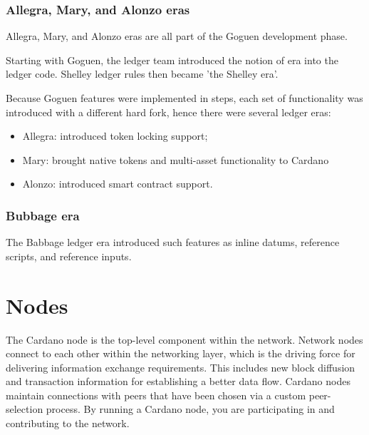 \vspace{0.5cm}

\subsubsection{Allegra, Mary, and Alonzo eras}

Allegra, Mary, and Alonzo eras are all part of the Goguen development phase.

\vspace{0.2cm}

\noindent
Starting with Goguen, the ledger team introduced the notion of era into the ledger code. 
Shelley ledger rules then became 'the Shelley era'.

\vspace{0.2cm}

\noindent
Because Goguen features were implemented in steps, each set of functionality was introduced 
with a different hard fork, hence there were several ledger eras:
\begin{itemize}
    \item Allegra: introduced token locking support;
    \item Mary: brought native tokens and multi-asset functionality to Cardano
    \item Alonzo: introduced smart contract support.
\end{itemize}

\vspace{0.2cm}

\subsubsection{Bubbage era}

The Babbage ledger era introduced such features as inline datums, reference scripts, and 
reference inputs.

\vspace{0.5cm}

\section{Nodes}

The Cardano node is the top-level component within the network. Network nodes connect to 
each other within the networking layer, which is the driving force for delivering 
information exchange requirements. This includes new block diffusion and transaction 
information for establishing a better data flow. Cardano nodes maintain connections 
with peers that have been chosen via a custom peer-selection process. By running a 
Cardano node, you are participating in and contributing to the network.

